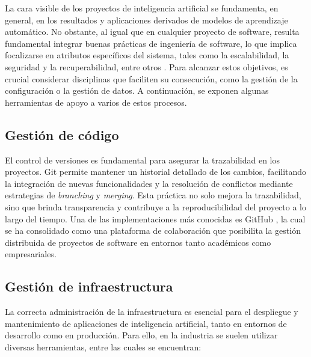 La cara visible de los proyectos de inteligencia artificial se fundamenta, en general, en los resultados y aplicaciones derivados de modelos de aprendizaje automático. No obstante, al igual que en cualquier proyecto de software, resulta fundamental integrar buenas prácticas de ingeniería de software, lo que implica focalizarse en atributos específicos del sistema, tales como la escalabilidad, la seguridad y la recuperabilidad, entre otros \citep{sommerville_software_2015}. Para alcanzar estos objetivos, es crucial considerar disciplinas que faciliten su consecución, como la gestión de la configuración o la gestión de datos. A continuación, se exponen algunas herramientas de apoyo a varios de estos procesos.

\subsection{Gestión de código}

El control de versiones es fundamental para asegurar la trazabilidad en los proyectos. Git permite mantener un historial detallado de los cambios, facilitando la integración de nuevas funcionalidades y la resolución de conflictos mediante estrategias de \textit{branching} y \textit{merging}. Esta práctica no solo mejora la trazabilidad, sino que brinda transparencia y contribuye a la reproducibilidad del proyecto a lo largo del tiempo. Una de las implementaciones más conocidas es GitHub \citep{github_build_nodate}, la cual se ha consolidado como una plataforma de colaboración que posibilita la gestión distribuida de proyectos de software en entornos tanto académicos como empresariales.

\subsection{Gestión de infraestructura}

La correcta administración de la infraestructura es esencial para el despliegue y mantenimiento de aplicaciones de inteligencia artificial, tanto en entornos de desarrollo como en producción. Para ello, en la industria se suelen utilizar diversas herramientas, entre las cuales se encuentran:

